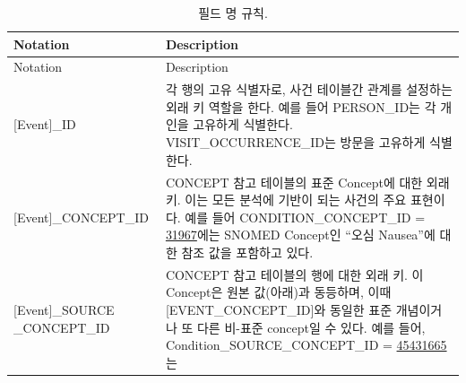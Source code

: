 \documentclass[11pt]{book}
\theoremstyle{definition}
\theoremstyle{definition}
\theoremstyle{definition}
\theoremstyle{remark}
\begin{document}
\begin{longtable}[]{@{}ll@{}}
\caption{\label{tab:fieldConventions} 필드 명 규칙.}\tabularnewline
\toprule
\begin{minipage}[b]{0.34\columnwidth}\raggedright\strut
Notation\strut
\end{minipage} & \begin{minipage}[b]{0.60\columnwidth}\raggedright\strut
Description\strut
\end{minipage}\tabularnewline
\midrule
\endfirsthead
\toprule
\begin{minipage}[b]{0.34\columnwidth}\raggedright\strut
Notation\strut
\end{minipage} & \begin{minipage}[b]{0.60\columnwidth}\raggedright\strut
Description\strut
\end{minipage}\tabularnewline
\midrule
\endhead
\begin{minipage}[t]{0.34\columnwidth}\raggedright\strut
{[}Event{]}\_ID\strut
\end{minipage} & \begin{minipage}[t]{0.60\columnwidth}\raggedright\strut
각 행의 고유 식별자로, 사건 테이블간 관계를 설정하는 외래 키 역할을
한다. 예를 들어 PERSON\_ID는 각 개인을 고유하게 식별한다.
VISIT\_OCCURRENCE\_ID는 방문을 고유하게 식별한다.\strut
\end{minipage}\tabularnewline
\begin{minipage}[t]{0.34\columnwidth}\raggedright\strut
{[}Event{]}\_CONCEPT\_ID\strut
\end{minipage} & \begin{minipage}[t]{0.60\columnwidth}\raggedright\strut
CONCEPT 참고 테이블의 표준 Concept에 대한 외래 키. 이는 모든 분석에
기반이 되는 사건의 주요 표현이다. 예를 들어 CONDITION\_CONCEPT\_ID =
\href{http://athena.ohdsi.org/search-terms/terms/31967}{31967}에는
SNOMED Concept인 ``오심 Nausea''에 대한 참조 값을 포함하고 있다.\strut
\end{minipage}\tabularnewline
\begin{minipage}[t]{0.34\columnwidth}\raggedright\strut
{[}Event{]}\_SOURCE \_CONCEPT\_ID\strut
\end{minipage} & \begin{minipage}[t]{0.60\columnwidth}\raggedright\strut
CONCEPT 참고 테이블의 행에 대한 외래 키. 이 Concept은 원본 값(아래)과
동등하며, 이때 {[}EVENT\_CONCEPT\_ID{]}와 동일한 표준 개념이거나 또 다른
비-표준 concept일 수 있다. 예를 들어, Condition\_SOURCE\_CONCEPT\_ID =
\href{http://athena.ohdsi.org/search-terms/terms/45431665}{45431665}는

\end{minipage}
\end{longtable}
\end{document}
